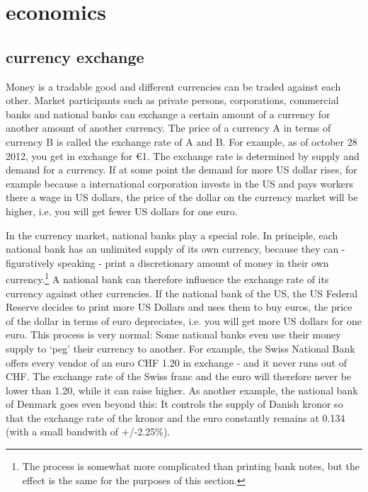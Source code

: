 \documentclass[11pt]{article}
\begin{document}
\section{economics}

\subsection{currency exchange}

Money is a tradable good and different currencies can be traded against each other. Market participants such as private persons, corporations, commercial banks and national banks can exchange a certain amount of a currency for another amount of another currency. The price of a currency A in terms of currency B is called the exchange rate of A and B. For example, as of october 28 2012, you get  in exchange for \euro{1}. The exchange rate is determined by supply and demand for a currency. If at some point the demand for more US dollar rises, for example because a international corporation invests in the US and pays workers there a wage in US dollars, the price of the dollar on the currency market will be higher, i.e. you will get fewer US dollars for one euro.

In the currency market, national banks play a special role. In principle, each national bank has an unlimited supply of its own currency, because they can - figuratively speaking - print a discretionary amount of money in their own currency.\footnote{The process is somewhat more complicated than printing bank notes, but the effect is the same for the purposes of this section.} A national bank can therefore influence the exchange rate of its currency against other currencies. If the national bank of the US, the US Federal Reserve decides to print more US Dollars and uses them to buy euros, the price of the dollar in terms of euro depreciates, i.e. you will get more US dollars for one euro. This process is very normal: Some national banks even use their money supply to `peg' their currency to another. For example, the Swiss National Bank offers every vendor of an euro CHF 1.20 in exchange - and it never runs out of CHF. The exchange rate of the Swiss franc and the euro will therefore never be lower than 1.20, while it can raise higher. As another example, the national bank of Denmark goes even beyond this: It controls the supply of Danish kronor so that the exchange rate of the kronor and the euro constantly remains at 0.134 (with a small bandwith of +/-2.25\%). 
\end{document}
